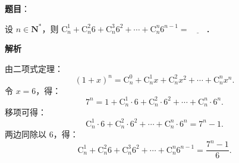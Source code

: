 \begin{answer}

\textbf{题目}：

设 $n \in \mathbf{N}^*$，则 $\mathrm{C}_n^1 + \mathrm{C}_n^2 6 + \mathrm{C}_n^3 6^2 + \cdots + \mathrm{C}_n^n 6^{n-1} = \underline{\hspace{2em}}$．

\textbf{解析}

由二项式定理：
\nopagebreak[4]
\[
(1 + x)^n = \mathrm{C}_n^0 + \mathrm{C}_n^1 x + \mathrm{C}_n^2 x^2 + \cdots + \mathrm{C}_n^n x^n.
\]
令 $x = 6$，得：
\nopagebreak[4]
\[
7^n = 1 + \mathrm{C}_n^1 \cdot 6 + \mathrm{C}_n^2 \cdot 6^2 + \cdots + \mathrm{C}_n^n \cdot 6^n.
\]
移项可得：
\nopagebreak[4]
\[
\mathrm{C}_n^1 \cdot 6 + \mathrm{C}_n^2 \cdot 6^2 + \cdots + \mathrm{C}_n^n \cdot 6^n = 7^n - 1.
\]
两边同除以 $6$，得：
\nopagebreak[4]
\[
\mathrm{C}_n^1 + \mathrm{C}_n^2 6 + \mathrm{C}_n^3 6^2 + \cdots + \mathrm{C}_n^n 6^{n-1} = \dfrac{7^n - 1}{6}.
\]


\end{answer}
